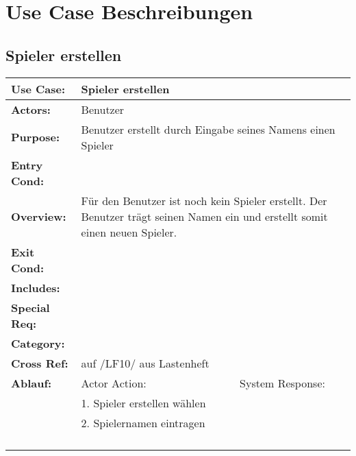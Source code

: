\clearpage

\chapter{Use Case Beschreibungen}


\section{Spieler erstellen}
\begin{tabular}{|l|l|l|l|l|l|l|}
\hline
\textbf{Use Case:} & \multicolumn{ 6}{l|}{Spieler erstellen} \\ \hline
\textbf{Actors:} & \multicolumn{ 6}{l|}{Benutzer} \\ \hline
\textbf{Purpose:} & \multicolumn{ 6}{l|}{Benutzer erstellt durch Eingabe seines Namens einen Spieler} \\ \hline
\textbf{Entry Cond:} & \multicolumn{ 6}{c|}{} \\ \hline
\textbf{Overview:} & \multicolumn{ 6}{l|}{Für den Benutzer ist noch kein Spieler erstellt. Der Benutzer trägt seinen Namen ein 
und erstellt somit einen neuen Spieler.} \\ \hline
\textbf{Exit Cond:} & \multicolumn{ 6}{l|}{} \\ \hline
\textbf{Includes:} & \multicolumn{ 6}{l|}{} \\ \hline
\textbf{Special Req:} & \multicolumn{ 6}{l|}{} \\ \hline
\textbf{Category:} & \multicolumn{ 6}{l|}{} \\ \hline
\textbf{Cross Ref:} & \multicolumn{ 6}{l|}{auf /LF10/ aus Lastenheft} \\ \hline
\textbf{Ablauf:} & \multicolumn{ 3}{l|}{Actor Action:} & \multicolumn{ 3}{l|}{System Response:} \\ \hline
\multicolumn{ 1}{|c|}{} & \multicolumn{ 3}{l|}{1. Spieler erstellen wählen} & \multicolumn{ 3}{l|}{} \\ \cline{ 2- 7}
\multicolumn{ 1}{|l|}{} & \multicolumn{ 3}{l|}{2. Spielernamen eintragen} & \multicolumn{ 3}{l|}{} \\ \cline{ 2- 7}
\multicolumn{ 1}{|l|}{} & \multicolumn{ 3}{l|}{} & \multicolumn{ 3}{l|}{} \\ \cline{ 2- 7}
\multicolumn{ 1}{|l|}{} & \multicolumn{ 3}{l|}{} & \multicolumn{ 3}{l|}{} \\ \cline{ 2- 7}
\multicolumn{ 1}{|l|}{} & \multicolumn{ 3}{l|}{} & \multicolumn{ 3}{l|}{} \\ \cline{ 2- 7}
\multicolumn{ 1}{|l|}{} & \multicolumn{ 3}{l|}{} & \multicolumn{ 3}{l|}{} \\ \hline
\end{tabular}


\section{}


